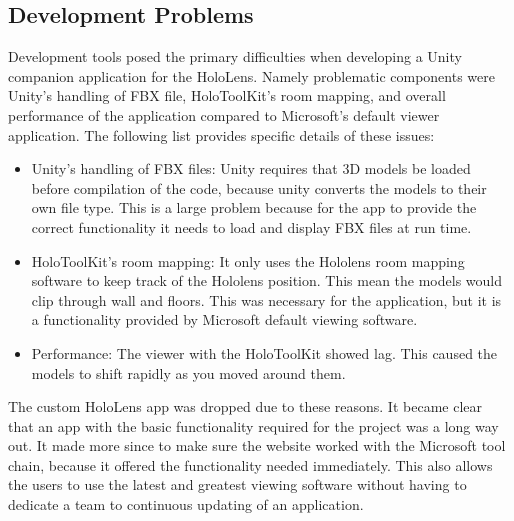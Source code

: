    \subsection{Development Problems}
    Development tools posed the primary difficulties when developing a Unity companion application for the HoloLens. Namely problematic components were Unity's handling of FBX file, HoloToolKit's room mapping, and overall performance of the application compared to Microsoft's default viewer application.
    The following list provides specific details of these issues:
    \begin{itemize}
        \item Unity's handling of FBX files: Unity requires that 3D models be loaded before compilation of the code, because unity converts the models to their own file type.
        This is a large problem because for the app to provide the correct functionality it needs to load and display FBX files at run time.
        \item HoloToolKit's room mapping: It only uses the Hololens room mapping software to keep track of the Hololens position.
        This mean the models would clip through wall and floors. This was necessary for the application, but it is a functionality provided by Microsoft default viewing software.
        \item Performance: The viewer with the HoloToolKit showed lag. This caused the models to shift rapidly as you moved around them. 
    \end{itemize}

    The custom HoloLens app was dropped due to these reasons. It became clear that an app with the basic functionality required for the project was a long way out.
    It made more since to make sure the website worked with the Microsoft tool chain, because it offered the functionality needed immediately.
    This also allows the users to use the latest and greatest viewing software without having to dedicate a team to continuous updating of an application.
